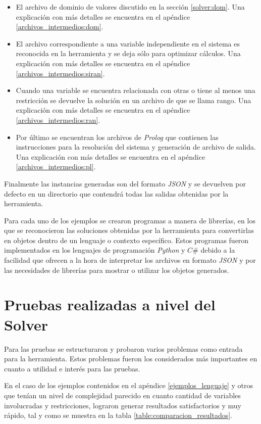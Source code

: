 \begin{itemize}
\item{El archivo de dominio de valores discutido en la sección \ref{solver:dom}. Una 
  explicación con más detalles se encuentra en el apéndice \ref{archivos_intermedios:dom}.}
\item{El archivo correspondiente a una variable independiente en el sistema es reconocida
  en la herramienta y se deja sólo para optimizar cálculos. Una explicación con más
  detalles se encuentra en el apéndice \ref{archivos_intermedios:siran}.}
\item{Cuando una variable se encuentra relacionada con otras o tiene al menos una
  restricción se devuelve la solución en un archivo de que se llama rango. Una 
  explicación con más detalles se encuentra en el apéndice \ref{archivos_intermedios:ran}.}
\item{Por último se encuentran los archivos de \emph{Prolog} que contienen las instrucciones
  para la resolución del sistema y generación de archivo de salida. Una explicación con más 
  detalles se encuentra en el apéndice \ref{archivos_intermedios:pl}.}
\end{itemize}

Finalmente las instancias generadas son del formato \emph{JSON} \cite{JSON} y se devuelven
por defecto en un directorio que contendrá todas las salidas obtenidas por la herramienta.

Para cada uno de los ejemplos se crearon programas a manera de librerías, en los que
se reconocieron las soluciones obtenidas por la herramienta para convertirlas en objetos
dentro de un lenguaje o contexto específico. Estos programas fueron implementados en 
los lenguajes de programación \emph{Python} \cite{Python} y \emph{$C\#$} \cite{CS} debido a la facilidad que ofrecen a la
hora de interpretar los archivos en formato \emph{JSON} y por las necesidades de librerías para
mostrar o utilizar los objetos generados.
\section{Pruebas realizadas a nivel del Solver}\label{imp_y_res:sol}
Para las pruebas se estructuraron y probaron varios problemas como entrada para
la herramienta. Estos problemas fueron los considerados más importantes en cuanto a utilidad e interés 
para las pruebas. 

En el caso de los ejemplos contenidos en el apéndice \ref{ejemplos_lenguaje} y
otros que tenían un nivel de complejidad parecido en cuanto cantidad de variables
involucradas y restricciones, lograron generar resultados satisfactorios y muy rápido,
tal y como se muestra en la tabla \ref{table:comparacion_resultados}.

